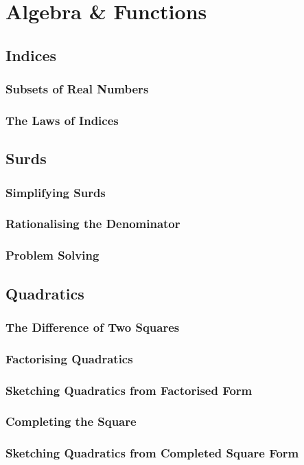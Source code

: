 \documentclass[../maths.tex]{subfiles}
\begin{document}
\chapter{Algebra \& Functions}
\section{Indices}
\subsection*{Subsets of Real Numbers}
\subsection*{The Laws of Indices}
\section{Surds}
\subsection*{Simplifying Surds}
\subsection*{Rationalising the Denominator}
\subsection*{Problem Solving}
\section{Quadratics}
\subsection*{The Difference of Two Squares}
\subsection*{Factorising Quadratics}
\subsection*{Sketching Quadratics from Factorised Form}
\subsection*{Completing the Square}
\subsection*{Sketching Quadratics from Completed Square Form}
\end{document}
